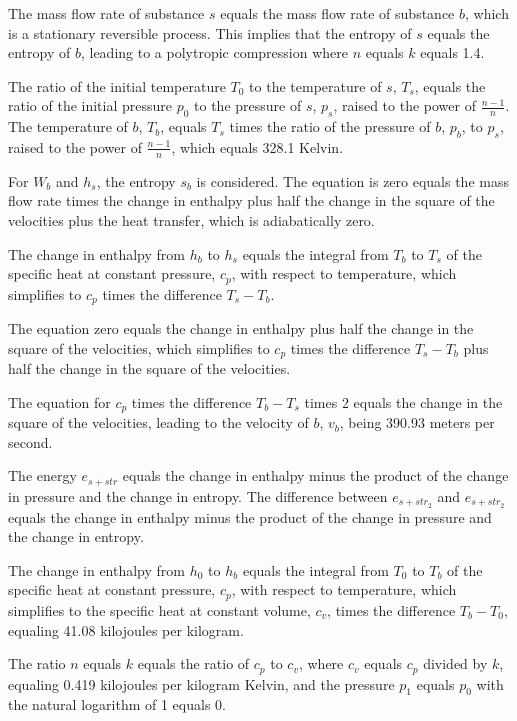 The mass flow rate of substance \( s \) equals the mass flow rate of substance \( b \), which is a stationary reversible process. This implies that the entropy of \( s \) equals the entropy of \( b \), leading to a polytropic compression where \( n \) equals \( k \) equals 1.4.

The ratio of the initial temperature \( T_0 \) to the temperature of \( s \), \( T_s \), equals the ratio of the initial pressure \( p_0 \) to the pressure of \( s \), \( p_s \), raised to the power of \( \frac{n-1}{n} \). The temperature of \( b \), \( T_b \), equals \( T_s \) times the ratio of the pressure of \( b \), \( p_b \), to \( p_s \), raised to the power of \( \frac{n-1}{n} \), which equals 328.1 Kelvin.

For \( W_b \) and \( h_s \), the entropy \( s_b \) is considered. The equation is zero equals the mass flow rate times the change in enthalpy plus half the change in the square of the velocities plus the heat transfer, which is adiabatically zero.

The change in enthalpy from \( h_b \) to \( h_s \) equals the integral from \( T_b \) to \( T_s \) of the specific heat at constant pressure, \( c_p \), with respect to temperature, which simplifies to \( c_p \) times the difference \( T_s - T_b \).

The equation zero equals the change in enthalpy plus half the change in the square of the velocities, which simplifies to \( c_p \) times the difference \( T_s - T_b \) plus half the change in the square of the velocities.

The equation for \( c_p \) times the difference \( T_b - T_s \) times 2 equals the change in the square of the velocities, leading to the velocity of \( b \), \( v_b \), being 390.93 meters per second.

The energy \( e_{s + str} \) equals the change in enthalpy minus the product of the change in pressure and the change in entropy. The difference between \( e_{s + str_2} \) and \( e_{s + str_2} \) equals the change in enthalpy minus the product of the change in pressure and the change in entropy.

The change in enthalpy from \( h_0 \) to \( h_b \) equals the integral from \( T_0 \) to \( T_b \) of the specific heat at constant pressure, \( c_p \), with respect to temperature, which simplifies to the specific heat at constant volume, \( c_v \), times the difference \( T_b - T_0 \), equaling 41.08 kilojoules per kilogram.

The ratio \( n \) equals \( k \) equals the ratio of \( c_p \) to \( c_v \), where \( c_v \) equals \( c_p \) divided by \( k \), equaling 0.419 kilojoules per kilogram Kelvin, and the pressure \( p_1 \) equals \( p_0 \) with the natural logarithm of 1 equals 0.

